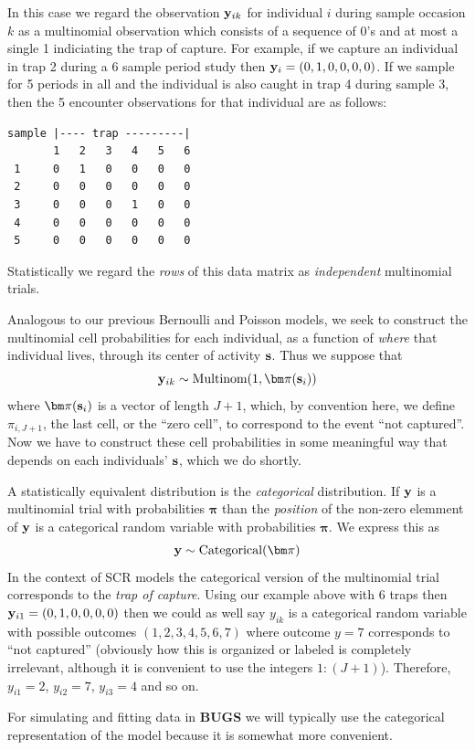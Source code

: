 {In this case we regard the observation ${\bf y}_{ik}$ for
individual $i$ during sample occasion $k$ as a multinomial observation
which consists of a sequence of 0's and at most a single 1 indiciating
the trap of capture. For example, if we capture an individual in trap
2 during a 6 sample period study then ${\bf y}_{i} = (0,1,0,0,0,0)$.
If we sample for 5 periods in all and the individual is also caught
in trap 4 during sample 3, then the 5 encounter observations for that
individual are as follows:
\begin{verbatim}
sample |---- trap ---------|
       1   2   3   4   5   6
 1     0   1   0   0   0   0
 2     0   0   0   0   0   0
 3     0   0   0   1   0   0
 4     0   0   0   0   0   0
 5     0   0   0   0   0   0
\end{verbatim}
Statistically we regard the {\it rows} of this data matrix as {\it
  independent} multinomial trials.

Analogous to our previous Bernoulli and Poisson models, we seek to
construct the multinomial cell probabilities for each individual, as a
function of {\it where} that individual lives, through its center of
activity ${\bf s}$. Thus we suppose that
\[
 {\bf y}_{ik} \sim \mbox{Multinom}(1, {\bm \pi}({\bf s}_{i}) )
\]
where ${\bm \pi}({\bf s}_{i})$ is a vector of length $J+1$, which, by
convention here, we define $\pi_{i,J+1}$, the last cell, or the ``zero
cell'', to correspond to the event ``not captured''.  Now we have to
construct these cell probabilities in some meaningful way that depends
on each individuals' ${\bf s}$, which we do shortly.

A statistically equivalent distribution is the {\it categorical} distribution.
If ${\bf y}$ is a multinomial trial with probabilities
${\bm \pi}$ than the {\it position} of the non-zero
elemment of ${\bf y}$ is a categorical random variable with probabilities
${\bm \pi}$.
We express this as
\[
{\bf y} \sim \mbox{Categorical}( {\bm \pi} )
\]
 In the context of SCR models the categorical version of
the 
multinomial trial corresponds to the {\it trap of capture}.
Using our example above with 6 traps then ${\bf y}_{i1} =
(0,1,0,0,0,0)$ then we could as well say $y_{ik}$ is a categorical
random variable with possible outcomes $(1,2,3,4,5,6,7)$ where outcome
$y=7$ corresponds to ``not captured'' (obviously how this is organized
or labeled is completely irrelevant, although it is convenient to use
the integers $1:(J+1)$).
Therefore, $y_{i1} = 2$, $y_{i2} = 7$, $y_{i3} = 4$ and so on.

For simulating and fitting data in {\bf BUGS} we will typically use
the categorical representation of the model because it is somewhat
more convenient.

}
